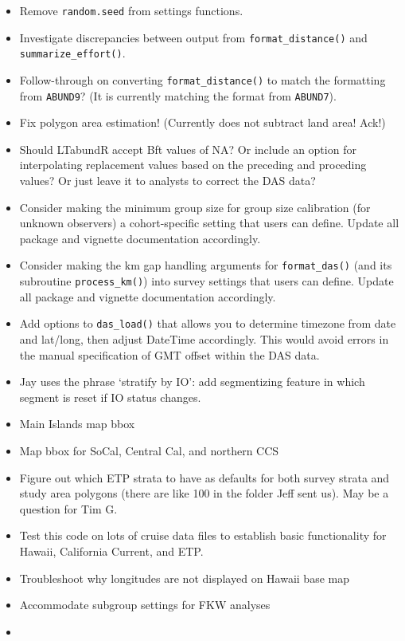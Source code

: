 \documentclass[
]{book}
\begin{document}
\begin{itemize}
\item
  Remove \texttt{random.seed} from settings functions.
\item
  Investigate discrepancies between output from \texttt{format\_distance()} and \texttt{summarize\_effort()}.
\item
  Follow-through on converting \texttt{format\_distance()} to match the formatting from \texttt{ABUND9}? (It is currently matching the format from \texttt{ABUND7}).
\item
  Fix polygon area estimation! (Currently does not subtract land area! Ack!)
\item
  Should LTabundR accept Bft values of NA? Or include an option for interpolating replacement values based on the preceding and proceding values? Or just leave it to analysts to correct the DAS data?
\item
  Consider making the minimum group size for group size calibration (for unknown observers) a cohort-specific setting that users can define. Update all package and vignette documentation accordingly.
\item
  Consider making the km gap handling arguments for \texttt{format\_das()} (and its subroutine \texttt{process\_km()}) into survey settings that users can define. Update all package and vignette documentation accordingly.
\item
  Add options to \texttt{das\_load()} that allows you to determine timezone from date and lat/long, then adjust DateTime accordingly. This would avoid errors in the manual specification of GMT offset within the DAS data.
\item
  Jay uses the phrase `stratify by IO': add segmentizing feature in which segment is reset if IO status changes.
\item
  Main Islands map bbox
\item
  Map bbox for SoCal, Central Cal, and northern CCS
\item
  Figure out which ETP strata to have as defaults for both survey strata and study area polygons (there are like 100 in the folder Jeff sent us). May be a question for Tim G.
\item
  Test this code on lots of cruise data files to establish basic functionality for Hawaii, California Current, and ETP.
\item
  Troubleshoot why longitudes are not displayed on Hawaii base map
\item
  Accommodate subgroup settings for FKW analyses
\item

\end{itemize}
\end{document}
